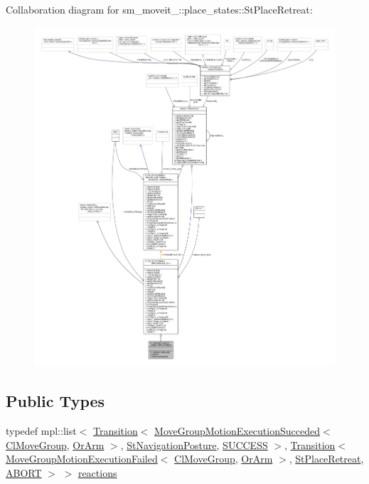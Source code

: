Collaboration diagram for sm\+\_\+moveit\+\_\+:\+:place\+\_\+states\+:\+:St\+Place\+Retreat\+:
\nopagebreak
\begin{figure}[H]
\begin{center}
\leavevmode
\includegraphics[width=350pt]{structsm__moveit__4_1_1place__states_1_1StPlaceRetreat__coll__graph}
\end{center}
\end{figure}
\subsection*{Public Types}
\begin{DoxyCompactItemize}
\item 
typedef mpl\+::list$<$ \hyperlink{classsmacc_1_1Transition}{Transition}$<$ \hyperlink{structmoveit__z__client_1_1MoveGroupMotionExecutionSucceded}{Move\+Group\+Motion\+Execution\+Succeded}$<$ \hyperlink{classmoveit__z__client_1_1ClMoveGroup}{Cl\+Move\+Group}, \hyperlink{classsm__moveit__4_1_1OrArm}{Or\+Arm} $>$, \hyperlink{structsm__moveit__4_1_1place__states_1_1StNavigationPosture}{St\+Navigation\+Posture}, \hyperlink{structsmacc_1_1default__transition__tags_1_1SUCCESS}{S\+U\+C\+C\+E\+SS} $>$, \hyperlink{classsmacc_1_1Transition}{Transition}$<$ \hyperlink{structmoveit__z__client_1_1MoveGroupMotionExecutionFailed}{Move\+Group\+Motion\+Execution\+Failed}$<$ \hyperlink{classmoveit__z__client_1_1ClMoveGroup}{Cl\+Move\+Group}, \hyperlink{classsm__moveit__4_1_1OrArm}{Or\+Arm} $>$, \hyperlink{structsm__moveit__4_1_1place__states_1_1StPlaceRetreat}{St\+Place\+Retreat}, \hyperlink{structsmacc_1_1default__transition__tags_1_1ABORT}{A\+B\+O\+RT} $>$ $>$ \hyperlink{structsm__moveit__4_1_1place__states_1_1StPlaceRetreat_a137af34354b6135e95217e02aefcc456}{reactions}
\end{DoxyCompactItemize}
